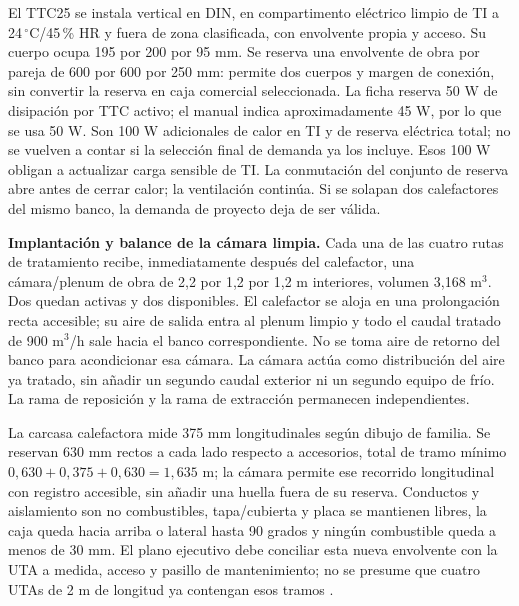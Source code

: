 El TTC25 se instala vertical en DIN, en compartimento eléctrico limpio de TI a 24\,$^{\circ}$C/45\,\% HR y fuera de zona clasificada, con envolvente propia y acceso. Su cuerpo ocupa 195 por 200 por 95 mm. Se reserva una envolvente de obra por pareja de 600 por 600 por 250 mm: permite dos cuerpos y margen de conexión, sin convertir la reserva en caja comercial seleccionada. La ficha reserva 50 W de disipación por TTC activo; el manual indica aproximadamente 45 W, por lo que se usa 50 W. Son 100 W adicionales de calor en TI y de reserva eléctrica total; no se vuelven a contar si la selección final de demanda ya los incluye. Esos 100 W obligan a actualizar carga sensible de TI. La conmutación del conjunto de reserva abre antes de cerrar calor; la ventilación continúa. Si se solapan dos calefactores del mismo banco, la demanda de proyecto deja de ser válida.

\textbf{Implantación y balance de la cámara limpia.} Cada una de las cuatro rutas de tratamiento recibe, inmediatamente después del calefactor, una cámara/plenum de obra de 2,2 por 1,2 por 1,2 m interiores, volumen 3,168 m$^3$. Dos quedan activas y dos disponibles. El calefactor se aloja en una prolongación recta accesible; su aire de salida entra al plenum limpio y todo el caudal tratado de 900 m$^3$/h sale hacia el banco correspondiente. No se toma aire de retorno del banco para acondicionar esa cámara. La cámara actúa como distribución del aire ya tratado, sin añadir un segundo caudal exterior ni un segundo equipo de frío. La rama de reposición y la rama de extracción permanecen independientes.

La carcasa calefactora mide 375 mm longitudinales según dibujo de familia. Se reservan 630 mm rectos a cada lado respecto a accesorios, total de tramo mínimo $0,630+0,375+0,630=1,635$ m; la cámara permite ese recorrido longitudinal con registro accesible, sin añadir una huella fuera de su reserva. Conductos y aislamiento son no combustibles, tapa/cubierta y placa se mantienen libres, la caja queda hacia arriba o lateral hasta 90 grados y ningún combustible queda a menos de 30 mm. El plano ejecutivo debe conciliar esta nueva envolvente con la UTA a medida, acceso y pasillo de mantenimiento; no se presume que cuatro UTAs de 2 m de longitud ya contengan esos tramos \parencite[pp.~5 y 10]{lote25-veab-cv}\parencite[p.~5]{lote25-veab-manual}.

